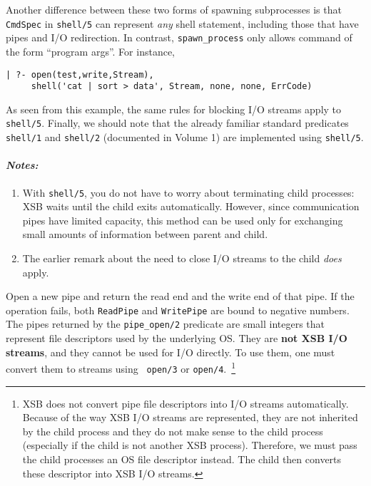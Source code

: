 \begin{description}
  Another difference between these two forms of spawning subprocesses is
  that {\tt CmdSpec} in {\tt shell/5} can represent \emph{any} shell
  statement, including those that have pipes and I/O redirection. In
  contrast, \verb|spawn_process| only allows command of the form ``program
  args''. For instance,
\begin{verbatim}
| ?- open(test,write,Stream),
     shell('cat | sort > data', Stream, none, none, ErrCode)
\end{verbatim}
As seen from this example, the same rules for blocking I/O streams
apply to {\tt shell/5}. Finally, we should note that the already
familiar standard predicates {\tt shell/1} and {\tt shell/2}
(documented in Volume 1) are implemented using {\tt shell/5}.

\paragraph{\em Notes:}
\begin{enumerate}
  \item  With {\tt shell/5}, you do not have to worry about terminating
    child processes: XSB waits until the child exits automatically.
    However, since communication pipes have limited capacity, this method
    can be used only for exchanging small amounts of information between
    parent and child.
  \item The earlier remark about the need to close I/O streams to the child
    \emph{does} apply.
\end{enumerate}

Open a new pipe and return the read end and the write end of that
pipe.  If the operation fails, both {\tt ReadPipe} and {\tt WritePipe}
are bound to negative numbers.
%  
The pipes returned by the {\tt pipe\_open/2} predicate are small
integers that represent file descriptors used by the underlying
OS. They are {\bf not XSB I/O streams}, and they cannot be used for
I/O directly. To use them, one must convert them to streams using {\tt
open/3} or {\tt open/4}.~\footnote{
XSB does not convert pipe file descriptors into I/O streams
automatically.  Because of the way XSB I/O streams are represented,
they are not inherited by the child process and they do not make sense
to the child process (especially if the child is not another XSB
process). Therefore, we must pass the child processes an OS file
descriptor instead. The child then converts these descriptor into XSB
I/O streams.  
}


\end{description}
